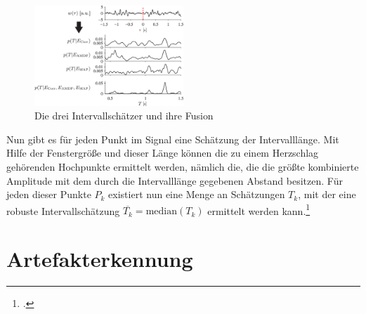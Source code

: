 	 \begin{figure}[H]
		\centering
		\includegraphics[width=0.5\textwidth]{pic/estimator-fusion.png}
		\caption[Intervallschätzer nach \citeauthor{Bruser2013}]{Die drei Intervallschätzer und ihre Fusion\footnotemark}
		\label{fig:estimator-fusion}
		
	\end{figure}
	
	Nun gibt es für jeden Punkt im Signal eine Schätzung der Intervalllänge. Mit Hilfe der Fenstergröße und dieser Länge können die zu einem Herzschlag gehörenden Hochpunkte ermittelt werden, nämlich die, die die größte kombinierte Amplitude mit dem durch die Intervalllänge gegebenen Abstand besitzen. Für jeden dieser Punkte $P_k$ existiert nun eine Menge an Schätzungen $T_k$, mit der eine robuste Intervallschätzung $\overline{T_k} = \text{median}(T_k)$ ermittelt werden kann.\footcites[Vgl. zu diesem Kapitel][]{Bruser2013}

\section{Artefakterkennung}\label{artefakterkennung}
	
